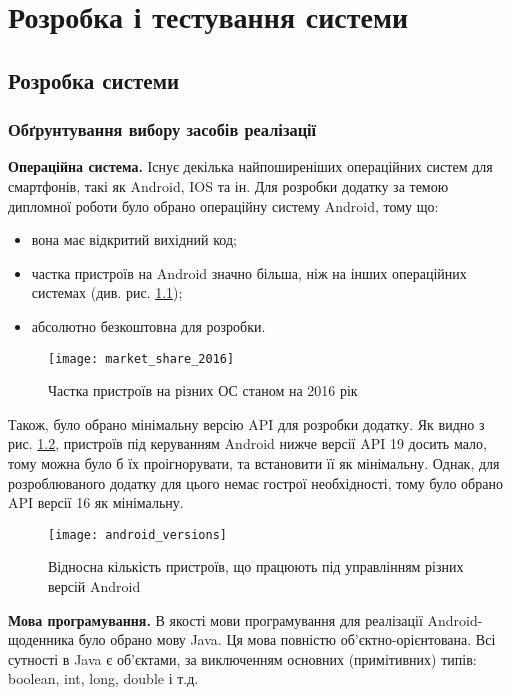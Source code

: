 \documentclass[../main.tex]{subfiles}
\begin{document}
	
\chapter{Розробка і тестування системи}
	
\section{Розробка  системи}
	
\subsection{Обґрунтування вибору засобів реалізації}

\textbf{Операційна система.}
Існує декілька найпоширеніших операційних систем для смартфонів, такі як Android, IOS та ін. Для розробки додатку за темою дипломної роботи було обрано операційну систему Android, тому що: 
\begin{itemize}[label={--}]
	\item вона має відкритий вихідний код;
	\item частка пристроїв на Android значно більша, ніж на інших операційних системах (див. рис. \ref{chart:market_share});
	\item абсолютно безкоштовна для розробки.
\end{itemize}

\begin{figure}[H]
	\centering
	\texttt{[image: market\_share\_2016]}
	\caption{Частка пристроїв на різних ОС станом на 2016 рік}
	\label{chart:market_share}
\end{figure}

Також, було обрано мінімальну версію API для розробки додатку. Як видно з рис. \ref{chart:android_versions}, пристроїв під керуванням Android нижче версії API 19 досить мало, тому можна було б їх проігнорувати, та встановити її як мінімальну. Однак, для розроблюваного додатку для цього немає гострої необхідності, тому було обрано API версії 16 як мінімальну.\\

\begin{figure}[H]
	\centering
	\texttt{[image: android\_versions]}
	\caption{Відносна кількість пристроїв, що працюють під управлінням різних версій Android}
	\label{chart:android_versions}
\end{figure}

\textbf{Мова програмування.} 
В якості мови програмування для реалізації Android-щоденника було обрано мову Java. Ця мова повністю об'єктно-\linebreak[0]орієнтована. Всі сутності в Java є об'єктами, за виключенням основних (примітивних) типів: boolean, int, long, double і т.д. 
\end{document}
